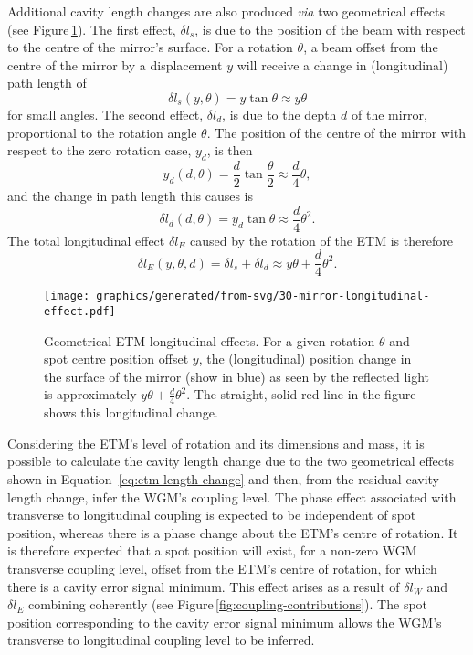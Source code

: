 Additional cavity length changes are also produced \emph{via} two geometrical effects (see Figure\,\ref{fig:mirror-longitudinal-effect}). The first effect, $\delta l_s$, is due to the position of the beam with respect to the centre of the mirror's surface. For a rotation $\theta$, a beam offset from the centre of the mirror by a displacement $y$ will receive a change in (longitudinal) path length of
\begin{equation}
  \delta l_s \left( y, \theta \right) = y \tan{\theta} \approx y \theta
  \label{eq:offset-effect}
\end{equation}
for small angles. The second effect, $\delta l_d$, is due to the depth $d$ of the mirror, proportional to the rotation angle $\theta$. The position of the centre of the mirror with respect to the zero rotation case, $y_d$, is then
\begin{equation}
  y_d \left( d, \theta \right) = \frac{d}{2} \tan{\frac{\theta}{2}} \approx \frac{d}{4} \theta,
\end{equation}
and the change in path length this causes is
\begin{equation}
  \delta l_d \left( d, \theta \right) = y_d \tan{\theta} \approx \frac{d}{4} \theta^2.
\end{equation}
The total longitudinal effect $\delta l_E$ caused by the rotation of the \gls{ETM} is therefore
\begin{equation}
\delta l_E \left(y, \theta, d \right) = \delta l_s + \delta l_d \approx y \theta + \frac{d}{4} \theta^2.
\label{eq:etm-length-change}
\end{equation}

\begin{figure}
  \centering
  \texttt{[image: graphics/generated/from-svg/30-mirror-longitudinal-effect.pdf]}
  \caption{\label{fig:mirror-longitudinal-effect}Geometrical \gls{ETM} longitudinal effects. For a given rotation $\theta$ and spot centre position offset $y$, the (longitudinal) position change in the surface of the mirror (show in blue) as seen by the reflected light is approximately $y \theta + \frac{d}{4} \theta^2$. The straight, solid red line in the figure shows this longitudinal change.}
\end{figure}

Considering the \gls{ETM}'s level of rotation and its dimensions and mass, it is possible to calculate the cavity length change due to the two geometrical effects shown in Equation~\ref{eq:etm-length-change} and then, from the residual cavity length change, infer the \gls{WGM}'s coupling level. The phase effect associated with transverse to longitudinal coupling is expected to be independent of spot position, whereas there is a phase change about the \gls{ETM}'s centre of rotation. It is therefore expected that a spot position will exist, for a non-zero \gls{WGM} transverse coupling level, offset from the \gls{ETM}'s centre of rotation, for which there is a cavity error signal minimum. This effect arises as a result of $\delta l_W$ and $\delta l_{E}$ combining coherently (see Figure\,\ref{fig:coupling-contributions}). The spot position corresponding to the cavity error signal minimum allows the \gls{WGM}'s transverse to longitudinal coupling level to be inferred.

